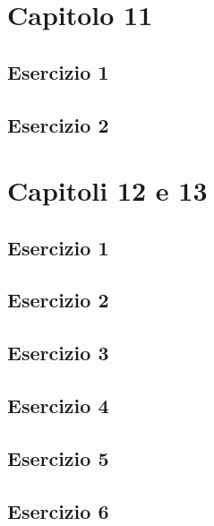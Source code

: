 \documentclass[a4paper,12pt,oneside]{book}
\begin{document}
\hypertarget{capitolo-11}{%
\section{Capitolo 11}\label{capitolo-11}}

\hypertarget{esercizio-1-7}{%
\subsection{Esercizio 1}\label{esercizio-1-7}}

\hypertarget{esercizio-2-7}{%
\subsection{Esercizio 2}\label{esercizio-2-7}}

\hypertarget{capitoli-12-e-13}{%
\section{Capitoli 12 e 13}\label{capitoli-12-e-13}}

\hypertarget{esercizio-1-8}{%
\subsection{Esercizio 1}\label{esercizio-1-8}}

\hypertarget{esercizio-2-8}{%
\subsection{Esercizio 2}\label{esercizio-2-8}}

\hypertarget{esercizio-3-6}{%
\subsection{Esercizio 3}\label{esercizio-3-6}}

\hypertarget{esercizio-4-4}{%
\subsection{Esercizio 4}\label{esercizio-4-4}}

\hypertarget{esercizio-5-3}{%
\subsection{Esercizio 5}\label{esercizio-5-3}}

\hypertarget{esercizio-6-2}{%
\subsection{Esercizio 6}\label{esercizio-6-2}}
\end{document}
